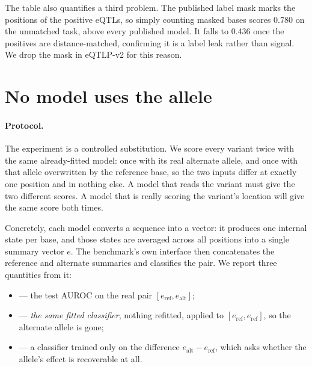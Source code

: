 The table also quantifies a third problem. The published label mask marks the
positions of the positive eQTLs, so simply counting masked bases scores 0.780 on
the unmatched task, above every published model. It falls to 0.436 once the
positives are distance-matched, confirming it is a label leak rather than signal.
We drop the mask in eQTLP-v2 for this reason.

\fi

\section{No model uses the allele}

\paragraph{Protocol.}
\ifdefined\RECOMB
The experiment is a controlled substitution. We score every variant twice with
the same already-fitted model: once with its real alternate allele, and once with
that allele overwritten by the reference base, so the two inputs differ at
exactly one position and in nothing else. A model that reads the variant must
give the two different scores. A model that is really scoring the variant's
location will give the same score both times.

Concretely, each model converts a sequence into a vector: it produces one
internal state per base, and those states are averaged across all positions into
a single summary vector $e$. The benchmark's own interface then concatenates the
reference and alternate summaries and classifies the pair. We report three
quantities from it:
\begin{itemize}
\item {} --- the test AUROC on the real pair $[e_{\mathrm{ref}},
e_{\mathrm{alt}}]$;
\item {} --- \emph{the same fitted classifier}, nothing refitted, applied
to $[e_{\mathrm{ref}}, e_{\mathrm{ref}}]$, so the alternate allele is gone;
\item \diffonly{} --- a classifier trained only on the difference
$e_{\mathrm{alt}} - e_{\mathrm{ref}}$, which asks whether the allele's effect is
recoverable at all.
\end{itemize}

